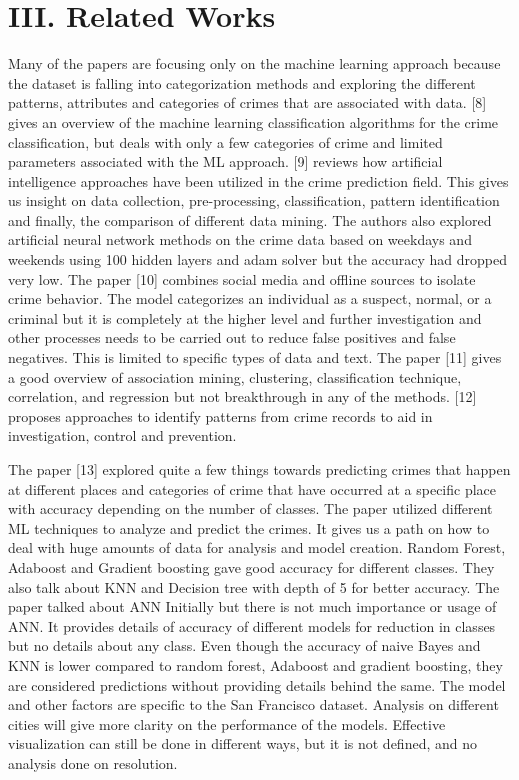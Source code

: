 \documentclass[conference,final, 10pt]{IEEEtran}
\begin{document}
\section{III. Related Works}\label{iii.-related-works}

Many of the papers are focusing only on the machine learning approach
because the dataset is falling into categorization methods and exploring
the different patterns, attributes and categories of crimes that are
associated with data. {[}8{]} gives an overview of the machine learning
classification algorithms for the crime classification, but deals with
only a few categories of crime and limited parameters associated with
the ML approach. {[}9{]} reviews how artificial intelligence approaches
have been utilized in the crime prediction field. This gives us insight
on data collection, pre-processing, classification, pattern
identification and finally, the comparison of different data mining. The
authors also explored artificial neural network methods on the crime
data based on weekdays and weekends using 100 hidden layers and adam
solver but the accuracy had dropped very low. The paper {[}10{]}
combines social media and offline sources to isolate crime behavior. The
model categorizes an individual as a suspect, normal, or a criminal but
it is completely at the higher level and further investigation and other
processes needs to be carried out to reduce false positives and false
negatives. This is limited to specific types of data and text. The paper
{[}11{]} gives a good overview of association mining, clustering,
classification technique, correlation, and regression but not
breakthrough in any of the methods. {[}12{]} proposes approaches to
identify patterns from crime records to aid in investigation, control
and prevention.

The paper {[}13{]} explored quite a few things towards predicting crimes
that happen at different places and categories of crime that have
occurred at a specific place with accuracy depending on the number of
classes. The paper utilized different ML techniques to analyze and
predict the crimes. It gives us a path on how to deal with huge amounts
of data for analysis and model creation. Random Forest, Adaboost and
Gradient boosting gave good accuracy for different classes. They also
talk about KNN and Decision tree with depth of 5 for better accuracy.
The paper talked about ANN Initially but there is not much importance or
usage of ANN. It provides details of accuracy of different models for
reduction in classes but no details about any class. Even though the
accuracy of naive Bayes and KNN is lower compared to random forest,
Adaboost and gradient boosting, they are considered predictions without
providing details behind the same. The model and other factors are
specific to the San Francisco dataset. Analysis on different cities will
give more clarity on the performance of the models. Effective
visualization can still be done in different ways, but it is not
defined, and no analysis done on resolution.
\end{document}

